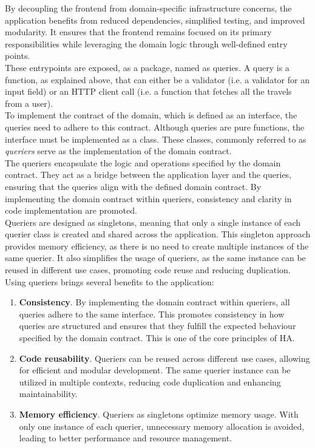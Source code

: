 \documentclass[../design.tex]{subfiles}
\begin{document}
By decoupling the frontend from domain-specific infrastructure concerns, the
application benefits from reduced dependencies, simplified testing, and improved
modularity. It ensures that the frontend remains focused on its primary
responsibilities while leveraging the domain logic through well-defined entry
points.
\\[8pt]
These entrypoints are exposed, as a package, named as queries. A query is a
function, as explained above, that can either be a validator (i.e. a validator
for an input field) or an HTTP client call (i.e. a function that fetches all the
travels from a user).
\\
To implement the contract of the domain, which is defined as an interface, the
queries need to adhere to this contract. Although queries are pure functions,
the interface must be implemented as a class. These classes, commonly referred
to as \emph{queriers} serve as the implementation of the domain contract.
\\
The queriers encapsulate the logic and operations specified by the domain
contract. They act as a bridge between the application layer and the queries,
ensuring that the queries align with the defined domain contract. By
implementing the domain contract within queriers, consistency and clarity in
code implementation are promoted.
\\
Queriers are designed as singletons, meaning that only a single instance of each
querier class is created and shared across the application. This singleton
approach provides memory efficiency, as there is no need to create multiple
instances of the same querier. It also simplifies the usage of queriers, as the
same instance can be reused in different use cases, promoting code reuse and
reducing duplication. Using queriers brings several benefits to the application:
\begin{enumerate}
	\item\textbf{Consistency}. By implementing the domain contract within
	queriers, all queries adhere to the same interface. This promotes
	consistency in how queries are structured and ensures that they fulfill the
	expected behaviour specified by the domain contract. This is one of the core
	principles of HA.
	\item\textbf{Code reusability}. Queriers can be reused across different use
	cases, allowing for efficient and modular development. The same querier
	instance can be utilized in multiple contexts, reducing code duplication
	and enhancing maintainability.
	\item\textbf{Memory efficiency}. Queriers as singletons optimize memory
	usage. With only one instance of each querier, unnecessary memory
	allocation is avoided, leading to better performance and resource
	management.
\end{enumerate}
\end{document}
